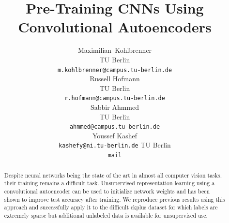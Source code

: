 \documentclass{article}
\title{Pre-Training CNNs Using Convolutional Autoencoders}
\author{
  Maximilian~Kohlbrenner\\
  TU Berlin\\
  \texttt{m.kohlbrenner@campus.tu-berlin.de} \\
  \And
  Russell Hofmann\\
  TU Berlin\\
  \texttt{r.hofmann@campus.tu-berlin.de} \\
  \AND
  Sabbir Ahmmed \\
  TU Berlin \\
  \texttt{ahmmed@campus.tu-berlin.de}\\
  \And
  Youssef Kashef \\
  \texttt{kashefy@ni.tu-berlin.de}
  TU Berlin \\
  \texttt{mail}
}
\begin{document}

\maketitle

\begin{abstract}
  Despite neural networks being the state of the art in almost all computer vision tasks, their training remains a difficult task. Unsupervised representation learning using a convolutional autoencoder can be used to initialize network weights and has been shown to improve test accuracy after training. We reproduce previous results using this approach and successfully apply it to the difficult ckplus dataset for which labels are extremely sparse but additional unlabeled data is available for unsupervised use.
\end{abstract}
\end{document}
